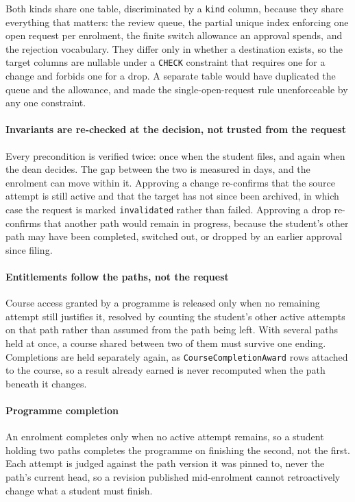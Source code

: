Both kinds share one table, discriminated by a \texttt{kind} column, because they share everything that matters: the review queue, the partial unique index enforcing one open request per enrolment, the finite switch allowance an approval spends, and the rejection vocabulary. They differ only in whether a destination exists, so the target columns are nullable under a \texttt{CHECK} constraint that requires one for a change and forbids one for a drop. A separate table would have duplicated the queue and the allowance, and made the single-open-request rule unenforceable by any one constraint.

\paragraph{Invariants are re-checked at the decision, not trusted from the request}
Every precondition is verified twice: once when the student files, and again when the dean decides. The gap between the two is measured in days, and the enrolment can move within it. Approving a change re-confirms that the source attempt is still active and that the target has not since been archived, in which case the request is marked \texttt{invalidated} rather than failed. Approving a drop re-confirms that another path would remain in progress, because the student's other path may have been completed, switched out, or dropped by an earlier approval since filing.

\paragraph{Entitlements follow the paths, not the request}
Course access granted by a programme is released only when no remaining attempt still justifies it, resolved by counting the student's other active attempts on that path rather than assumed from the path being left. With several paths held at once, a course shared between two of them must survive one ending. Completions are held separately again, as \texttt{CourseCompletionAward} rows attached to the course, so a result already earned is never recomputed when the path beneath it changes.

\paragraph{Programme completion}
An enrolment completes only when no active attempt remains, so a student holding two paths completes the programme on finishing the second, not the first. Each attempt is judged against the path version it was pinned to, never the path's current head, so a revision published mid-enrolment cannot retroactively change what a student must finish.


